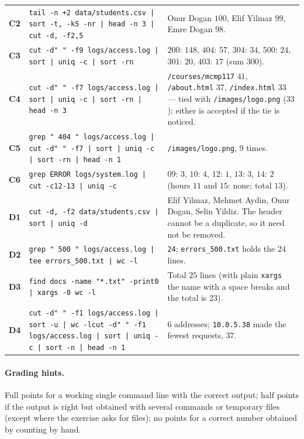 \documentclass[11pt,a4paper]{article}
\newcommand{\cmd}[1]{\texttt{#1}}
\begin{document}
{\begin{longtable}{@{}p{0.8cm}>{\raggedright\arraybackslash}p{8.4cm}>{\raggedright\arraybackslash}p{6.3cm}@{}}
\textbf{C2} & \texttt{tail -n +2 data/students.csv |\allowbreak{} sort -t, -k5 -nr |\allowbreak{} head -n 3 |\allowbreak{} cut -d, -f2,5} & Onur Dogan $100$, Elif Yilmaz $99$, Emre Dogan $98$.\\
\textbf{C3} & \texttt{cut -d" " -f9 logs/access.log |\allowbreak{} sort |\allowbreak{} uniq -c |\allowbreak{} sort -rn} & $200$: $148$, $404$: $57$, $304$: $34$, $500$: $24$, $301$: $20$, $403$: $17$ (sum $300$).\\
\textbf{C4} & \texttt{cut -d" " -f7 logs/access.log |\allowbreak{} sort |\allowbreak{} uniq -c |\allowbreak{} sort -rn |\allowbreak{} head -n 3} & \texttt{/courses/mcmp117} $41$, \texttt{/about.html} $37$, \texttt{/index.html} $33$ --- tied with \texttt{/images/logo.png} ($33$); either is accepted if the tie is noticed.\\
\textbf{C5} & \texttt{grep " 404 " logs/access.log |\allowbreak{} cut -d" " -f7 |\allowbreak{} sort |\allowbreak{} uniq -c |\allowbreak{} sort -rn |\allowbreak{} head -n 1} & \texttt{/images/logo.png}, $9$ times.\\
\textbf{C6} & \texttt{grep ERROR logs/system.log |\allowbreak{} cut -c12-13 |\allowbreak{} uniq -c} & $09$: $3$, $10$: $4$, $12$: $1$, $13$: $3$, $14$: $2$ (hours $11$ and $15$: none; total $13$).\\
\textbf{D1} & \texttt{cut -d, -f2 data/students.csv |\allowbreak{} sort |\allowbreak{} uniq -d} & Elif Yilmaz, Mehmet Aydin, Onur Dogan, Selin Yildiz. The header cannot be a duplicate, so it need not be removed.\\
\textbf{D2} & \texttt{grep " 500 " logs/access.log |\allowbreak{} tee errors\_500.txt |\allowbreak{} wc -l} & \texttt{24}; \texttt{errors\_500.txt} holds the $24$ lines.\\
\textbf{D3} & \texttt{find docs -name "*.txt" -print0 |\allowbreak{} xargs -0 wc -l} & Total $25$ lines (with plain \cmd{xargs} the name with a space breaks and the total is $23$).\\
\textbf{D4} & \texttt{cut -d" " -f1 logs/access.log |\allowbreak{} sort -u |\allowbreak{} wc -l}\newline \texttt{cut -d" " -f1 logs/access.log |\allowbreak{} sort |\allowbreak{} uniq -c |\allowbreak{} sort -n |\allowbreak{} head -n 1} & $6$ addresses; \texttt{10.0.5.38} made the fewest requests, $37$.\\
\bottomrule
\end{longtable}
}

\paragraph{Grading hints.} Full points for a working single command line with the correct output; half points if the output is right but obtained with several commands or temporary files (except where the exercise asks for files); no points for a correct number obtained by counting by hand.
\end{document}
